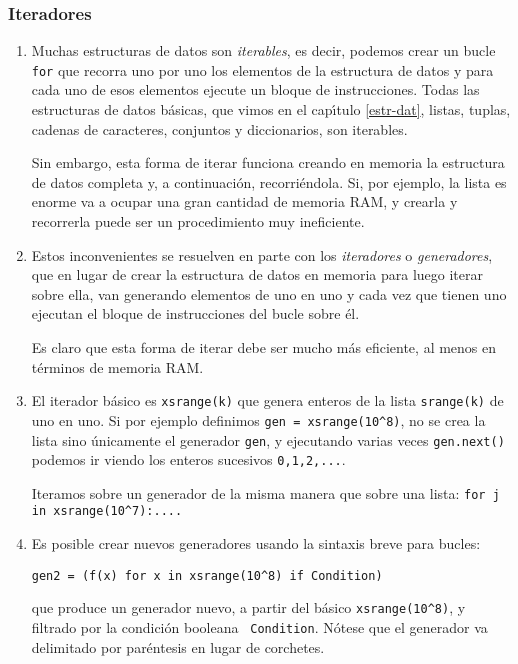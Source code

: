 \subsubsection{Iteradores}\label{iter}
\begin{enumerate}
\item Muchas estructuras de datos son {\itshape iterables}, es decir, podemos
crear un bucle \lstinline|for| que recorra uno por uno los elementos de la
estructura
de datos y para cada uno de esos elementos ejecute un bloque de instrucciones.
Todas las estructuras de datos b\'asicas, que vimos en el cap\'{\i}tulo
\ref{estr-dat}, listas, tuplas, cadenas de caracteres, conjuntos y diccionarios,
son iterables. 

Sin embargo, esta forma de iterar funciona creando en memoria la estructura de
datos completa y, a continuaci\'on, 
recorri\'endola. Si, por ejemplo,  la lista es enorme va a ocupar una gran
cantidad de memoria RAM, y crearla y recorrerla puede ser un procedimiento muy
ineficiente.

\item Estos inconvenientes se resuelven en parte con los {\itshape iteradores} o
{\itshape generadores}, que en lugar de crear la estructura de datos en memoria
para luego iterar sobre ella,  van generando elementos de uno en uno y cada vez
que tienen uno ejecutan el bloque de instrucciones del bucle sobre \'el. 

Es claro que esta forma de iterar debe ser mucho m\'as eficiente, al menos en
t\'erminos de memoria RAM. 


\item  El iterador b\'asico  es \lstinline|xsrange(k)| que genera enteros de la
lista
\lstinline|srange(k)| de uno en uno. Si por ejemplo definimos %
\lstinline|gen = xsrange(10^8)|,  no se crea la lista sino \'unicamente el
generador 
\lstinline|gen|, y
ejecutando varias veces \lstinline|gen.next()| podemos ir viendo  los enteros
sucesivos {\tt 0,1,2,...}. 

 
 Iteramos sobre un generador de la misma manera que sobre una lista: %
 \lstinline|for j in xsrange(10^7):....|
 
 \item \label{iter2}Es posible crear nuevos generadores usando la sintaxis
breve para bucles:
 \begin{lstlisting}[numbers=none]
 gen2 = (f(x) for x in xsrange(10^8) if Condition)
 \end{lstlisting}
\noindent que produce un generador nuevo, a partir del b\'asico 
\lstinline|xsrange(10^8)|, y filtrado por la condici\'on booleana {\tt
Condition}.
N\'otese
que el generador va delimitado por par\'entesis en lugar de corchetes. 
 
 \end{enumerate}



